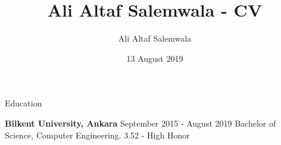 \documentclass{resume} %
\title{Ali Altaf Salemwala - CV}
\author{Ali Altaf Salemwala}
\date{13 August 2019}
\begin{document}


\begin{rSection}{Education}

\textbf{Bilkent University, Ankara} \hfill September 2015 - August 2019 \newline
Bachelor of Science, Computer Engineering. \hfill 3.52 - High Honor

\end{rSection}

\end{document}

